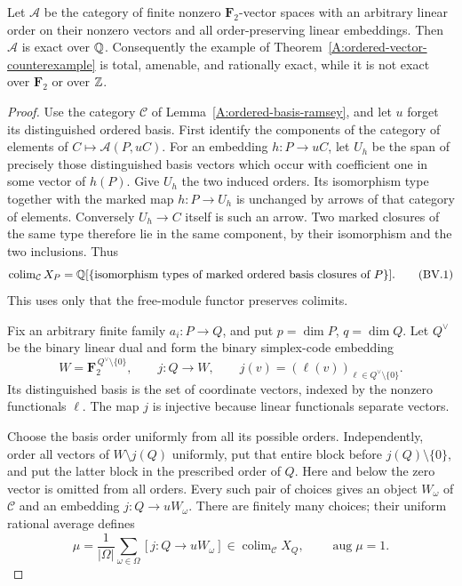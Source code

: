 \begin{theorem}
\label{A:ordered-vector-rational-exactness}
Let $\mathcal A$ be the category of finite nonzero
$\mathbf F_2$-vector spaces with an arbitrary linear order on their
nonzero vectors and all order-preserving linear embeddings.
Then $\mathcal A$ is exact over $\mathbb Q$.
Consequently the example of
Theorem~\ref{A:ordered-vector-counterexample} is total, amenable, and
rationally exact, while it is not exact over $\mathbf F_2$ or over $\mathbb Z$.
\end{theorem}
\begin{proof}
Use the category $\mathcal C$ of
Lemma~\ref{A:ordered-basis-ramsey}, and let $u$ forget its distinguished
ordered basis.  First identify the components of the category of
elements of $C\mapsto\mathcal A(P,uC)$.
For an embedding $h:P\to uC$, let $U_h$ be the span of precisely those
distinguished basis vectors which occur with coefficient one in some
vector of $h(P)$.  Give $U_h$ the two induced orders.  Its isomorphism
type together with the marked map $h:P\to U_h$ is unchanged by arrows
of that category of elements.  Conversely $U_h\to C$ itself is such
an arrow.  Two marked closures of the same type therefore lie in the
same component, by their isomorphism and the two inclusions.  Thus
\[
 \operatorname{colim}_{\mathcal C}X_P
   =\mathbb Q[\{\text{isomorphism types of marked ordered basis closures of }P\}].
 \tag{BV.1}
\]
This uses only that the free-module functor preserves colimits.

Fix an arbitrary finite family $a_i:P\to Q$, and put
$p=\dim P$, $q=\dim Q$.  Let $Q^\vee$ be the binary linear dual and
form the binary simplex-code embedding
\[
 W=\mathbf F_2^{\,Q^\vee\setminus\{0\}},\qquad
 j:Q\longrightarrow W,\qquad
 j(v)=(\ell(v))_{\ell\in Q^\vee\setminus\{0\}}.
 \tag{BV.2}
\]
Its distinguished basis is the set of coordinate vectors, indexed by
the nonzero functionals $\ell$.  The map $j$ is injective because
linear functionals separate vectors.

Choose the basis order uniformly from all its possible orders.
Independently, order all vectors of
$W\setminus j(Q)$ uniformly, put that entire block before
$j(Q)\setminus\{0\}$, and put the latter block in the prescribed
order of $Q$.  Here and below the zero vector is omitted from all
orders.  Every such pair of choices gives an object $W_\omega$ of
$\mathcal C$ and an embedding $j:Q\to uW_\omega$.
There are finitely many choices; their uniform rational average defines
\[
 \mu=\frac{1}{|\Omega|}\sum_{\omega\in\Omega}[j:Q\to uW_\omega]
       \in\operatorname{colim}_{\mathcal C}X_Q,
 \qquad\operatorname{aug}\mu=1.
 \tag{BV.3}
\]


\end{proof}
